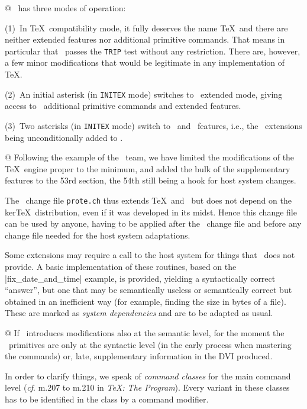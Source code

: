 @ \Prote\ has three modes of operation:

(1)~In \TeX\ compatibility mode, it fully deserves the name \TeX\ and
there are neither extended features nor additional primitive commands.
That means in particular that \Prote\ passes the {\tt TRIP} test
without any restriction.  There are, however, a few
minor modifications that would be legitimate in any implementation of
\TeX{}.

(2)~An initial asterisk (in {\tt INITEX} mode) switches to \eTeX\
extended mode, giving access to \eTeX\ additional primitive commands
and extended features.

(3)~Two asterisks (in {\tt INITEX} mode) switch to \eTeX\ and \Prote\
features, i.e., the \Prote\ extensions being unconditionally added to
\eTeX.

@ Following the example of the \NTS\ team, we have limited the
modifications of the \TeX\ engine proper to the minimum, and added the
bulk of the supplementary features to the 53rd section, the 54th
still being a hook for host system changes.

The \Prote\ change file {\tt prote.ch} thus extends \TeX\ and \eTeX\ but
does not depend on the ker\TeX\ distribution, even if it was developed
in its midst. Hence this change file can be used by anyone, having to be
applied after the \eTeX\ change file and before any change file needed
for the host system adaptations.

Some extensions may require a call to the host system for things that
\PASCAL\ does not provide. A basic implementation of these routines,
based on the |fix_date_and_time| example, is provided, yielding a 
syntactically correct ``answer'', but one that may be semantically
useless or semantically correct but obtained in an inefficient way
(for example, finding the size in bytes of a file). These are marked
as {\sl system dependencies} and are to be adapted as usual.

@ If \eTeX\ introduces modifications also at the semantic level,
for the moment the \Prote\ primitives are only at the syntactic
level (in the early process when mastering the commands) or, late,
supplementary information in the DVI produced.

In order to clarify things, we speak of {\sl command classes} for
the main command level ({\it cf}. m.207 to m.210 in {\sl \TeX: The Program}). 
Every variant in these classes has to be identified in the class by a
command modifier.


